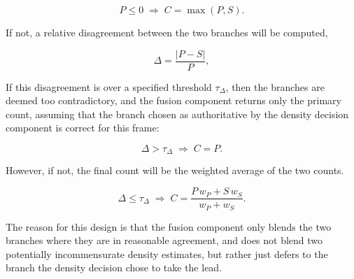 \begin{equation}
	P \le 0 \;\Rightarrow\; C = \max(P,S).
\end{equation}

If not, a relative disagreement between the two branches will be computed,

\begin{equation}
	\Delta = \frac{|P-S|}{P},
\end{equation}

If this disagreement is over a specified threshold $\tau_{\Delta}$, then the branches are deemed too contradictory, and the fusion component returns only the primary count, assuming that the branch chosen as authoritative by the density decision component is correct for this frame:

\begin{equation}
	\Delta > \tau_{\Delta} \;\Rightarrow\; C = P.
\end{equation}


However, if not, the final count will be the weighted average of the two counts.

\begin{equation}
	\Delta \le \tau_{\Delta} \;\Rightarrow\; C = \frac{P\,w_P + S\,w_S}{w_P + w_S}.
\end{equation}

The reason for this design is that the fusion component only blends the two branches where they are in reasonable agreement, and does not blend two potentially incommensurate density estimates, but rather just defers to the branch the density decision chose to take the lead.



